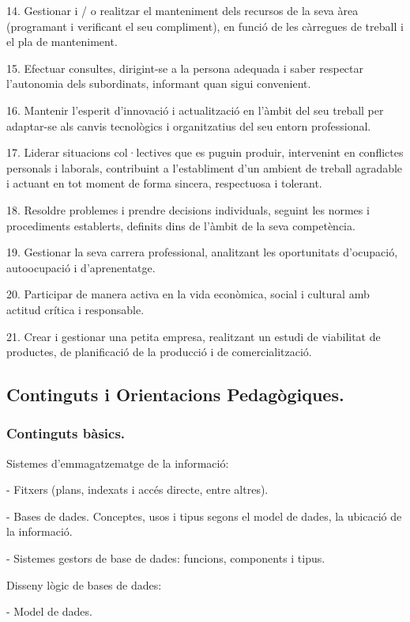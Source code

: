 \documentclass[catalan, a4paper, 12pt, titlepage]{article}
\begin{document}
14. Gestionar i / o realitzar el manteniment dels recursos de la seva àrea (programant i verificant el seu compliment), en funció de les càrregues de treball i el pla de manteniment.

15. Efectuar consultes, dirigint-se a la persona adequada i saber respectar l'autonomia dels subordinats, informant quan sigui convenient.

16. Mantenir l'esperit d'innovació i actualització en l'àmbit del seu treball per adaptar-se als canvis tecnològics i organitzatius del seu entorn professional.

17. Liderar situacions col·lectives que es puguin produir, intervenint en conflictes personals i laborals, contribuint a l'establiment d'un ambient de treball agradable i actuant en tot moment de forma sincera, respectuosa i tolerant.

18. Resoldre problemes i prendre decisions individuals, seguint les normes i procediments establerts, definits dins de l'àmbit de la seva competència.

19. Gestionar la seva carrera professional, analitzant les oportunitats d'ocupació, autoocupació i d'aprenentatge.

20. Participar de manera activa en la vida econòmica, social i cultural amb actitud crítica i responsable.

21. Crear i gestionar una petita empresa, realitzant un estudi de viabilitat de productes, de planificació de la producció i de comercialització.


\subsection{Continguts i Orientacions Pedagògiques.}

\subsubsection{Continguts bàsics.}

Sistemes d'emmagatzematge de la informació:

- Fitxers (plans, indexats i accés directe, entre altres).

- Bases de dades. Conceptes, usos i tipus segons el model de dades, la ubicació de la informació.

- Sistemes gestors de base de dades: funcions, components i tipus.

Disseny lògic de bases de dades:

- Model de dades.
\end{document}
